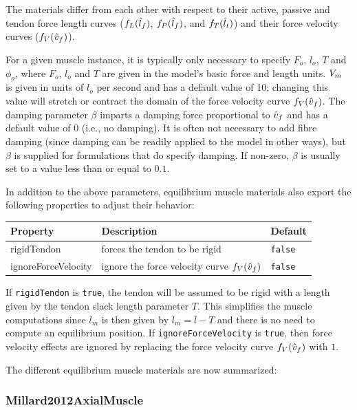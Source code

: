 The materials differ from each other with respect to their active,
passive and tendon force length curves ($f_L(\hat{l}_f)$, $f_P(\hat{l}_f)$, and
$f_T(\hat{l}_t)$) and their force velocity curves ($f_V(\hat{v}_f)$).

For a given muscle instance, it is typically only necessary to specify
$F_o$, $l_o$, $T$ and $\phi_o$, where $F_o$, $l_o$ and $T$ are given
in the model's basic force and length units. $V_{m}$ is given in units
of $l_o$ per second and has a default value of 10; changing this value
will stretch or contract the domain of the force velocity curve
$f_V(\hat{v}_f)$. The damping parameter $\beta$ imparts a damping force
proportional to $\hat{v}_f$ and has a default value of 0 (i.e., no
damping). It is often not necessary to add fibre damping (since
damping can be readily applied to the model in other ways), but
$\beta$ is supplied for formulations that do specify damping.  If
non-zero, $\beta$ is usually set to a value less than or equal to
$0.1$.

In addition to the above parameters, equilibrium muscle materials also
export the following properties to adjust their behavior:

\begin{center}
\begin{tabular}{|l|l|l|} 
\hline
Property & Description & Default \\
\hline
{\sf rigidTendon} & forces the tendon to be rigid & {\tt false} \\
{\sf ignoreForceVelocity} & 
ignore the force velocity curve $f_V(\hat{v}_f)$ & {\tt false} \\
\hline
\end{tabular}
\end{center}

If {\tt rigidTendon} is {\tt true}, the tendon will be assumed to be
rigid with a length given by the tendon slack length parameter $T$.
This simplifies the muscle computations since $l_m$ is then given by
$l_m = l - T$ and there is no need to compute an equilibrium position.
If {\tt ignoreForceVelocity} is {\tt true}, then force velocity
effects are ignored by replacing the force velocity curve $f_V(\hat{v}_f)$
with $1$.

The different equilibrium muscle materials are now summarized:

\subsubsection{Millard2012AxialMuscle}
\label{Millard2012AxialMuscle:sec}


